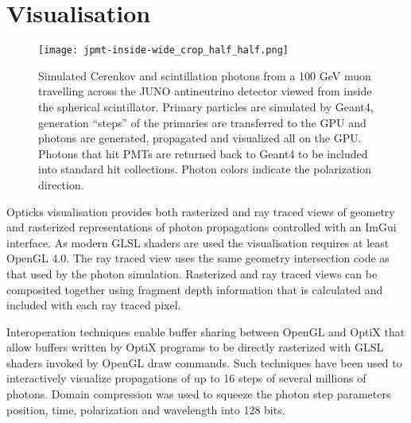 \documentclass[a4paper]{jpconf}
\begin{document}

\section{Visualisation}

\begin{figure}[htbp]
\centering
\texttt{[image: jpmt-inside-wide\_crop\_half\_half.png]}
\caption{Simulated Cerenkov and scintillation photons from a 100 GeV muon travelling
across the JUNO antineutrino detector viewed from inside the spherical scintillator.
Primary particles are simulated by Geant4, generation ``steps'' of the primaries
are transferred to the GPU and photons are generated, propagated and visualized
all on the GPU. Photons that hit PMTs
are returned back to Geant4 to be included into standard hit collections.
Photon colors indicate the polarization direction.}
\end{figure}

Opticks visualisation provides both rasterized and ray traced views 
of geometry and rasterized representations of photon propagations
controlled with an ImGui\cite{ImGui} interface. As modern GLSL 
shaders are used the visualisation requires at least OpenGL 4.0.
The ray traced view uses the same geometry intersection 
code as that used by the photon simulation.  
Rasterized and ray traced views can be composited together using fragment 
depth information that is calculated and included with each ray traced pixel.

Interoperation techniques enable buffer sharing between OpenGL and OptiX 
that allow buffers written by OptiX programs to be directly rasterized 
with GLSL shaders invoked by OpenGL draw commands. Such techniques 
have been used to interactively visualize propagations of up to 16 
steps of several millions of photons. Domain compression was used 
to squeeze the photon step parameters position, time, polarization 
and wavelength into 128 bits. 
\end{document}

